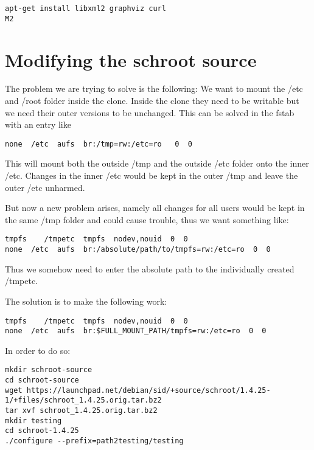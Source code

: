 \documentclass[a4paper]{book}
\begin{document}
\begin{verbatim}
apt-get install libxml2 graphviz curl
M2
\end{verbatim}

\section{Modifying the schroot source}

The problem we are trying to solve is the following: We want to mount the /etc
and /root folder inside the clone. Inside the clone they need to be writable
but we need their outer versions to be unchanged.  This can be solved in the
fstab with an entry like

\begin{verbatim}
none  /etc  aufs  br:/tmp=rw:/etc=ro   0  0
\end{verbatim}

This will mount both the outside /tmp and the outside /etc folder onto the
inner /etc. Changes in the inner /etc would be kept in the outer /tmp and leave
the outer /etc unharmed.

But now a new problem arises, namely all changes for all users would be kept in
the same /tmp folder and could cause trouble, thus we want something like:

\begin{verbatim}
tmpfs    /tmpetc  tmpfs  nodev,nouid  0  0
none  /etc  aufs  br:/absolute/path/to/tmpfs=rw:/etc=ro  0  0
\end{verbatim}

Thus we somehow need to enter the absolute path to the individually created /tmpetc.

The solution is to make the following work:

\begin{verbatim}
tmpfs    /tmpetc  tmpfs  nodev,nouid  0  0
none  /etc  aufs  br:$FULL_MOUNT_PATH/tmpfs=rw:/etc=ro  0  0
\end{verbatim}

In order to do so:

\begin{verbatim}
mkdir schroot-source
cd schroot-source
wget https://launchpad.net/debian/sid/+source/schroot/1.4.25-1/+files/schroot_1.4.25.orig.tar.bz2
tar xvf schroot_1.4.25.orig.tar.bz2
mkdir testing
cd schroot-1.4.25
./configure --prefix=path2testing/testing
\end{verbatim}
\end{document}
